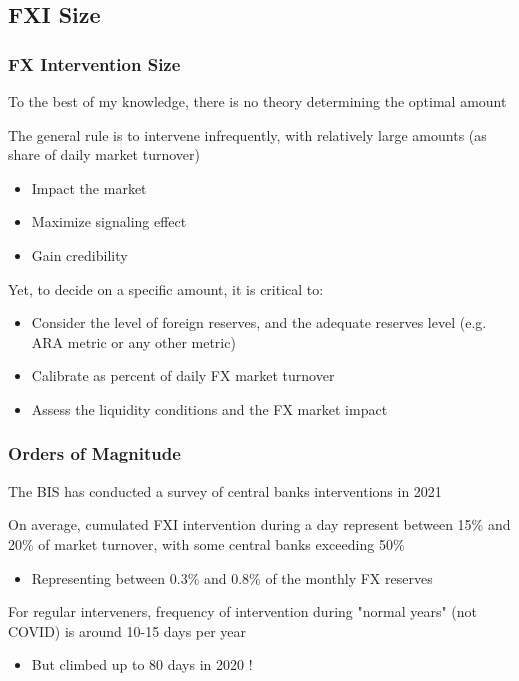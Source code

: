 \documentclass{beamer}
\newenvironment{wideitemize}{\itemize\addtolength{\itemsep}{10pt}}{\enditemize}
\begin{document}
\subsection{FXI Size}
\begin{frame}
  \frametitle{FX Intervention Size}
  \begin{wideitemize}
  \item To the best of my knowledge, there is no theory determining the optimal amount
  \item The general rule is to intervene infrequently, with relatively large amounts (as share of daily market turnover)
    \begin{itemize}
    \item Impact the market
    \item Maximize signaling effect
    \item Gain credibility
    \end{itemize}
  \item Yet, to decide on a specific amount, it is critical to:
    \begin{itemize}
    \item Consider the level of foreign reserves, and the adequate reserves level (e.g. ARA metric or any other metric)
    \item Calibrate as percent of daily FX market turnover
    \item Assess the liquidity conditions and the FX market impact
    \end{itemize}
  \end{wideitemize}
\end{frame}


\begin{frame}
  \frametitle{Orders of Magnitude}
  \begin{wideitemize}
  \item The BIS has conducted a survey of central banks interventions in 2021 \href{https://www.bis.org/publ/mc_insights_fxinterventions.pdf}{}
  \item On average, cumulated FXI intervention during a day represent between 15\% and 20\% of market turnover, with some central banks exceeding 50\%
    \begin{itemize}
    \item Representing between 0.3\% and 0.8\% of the monthly FX reserves
    \end{itemize}
  \item For regular interveners, frequency of intervention during "normal years" (not COVID) is around 10-15 days per year
    \begin{itemize}
    \item But climbed up to 80 days in 2020 !
    \end{itemize}
  \end{wideitemize}
\end{frame}
\end{document}

